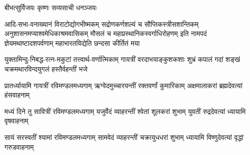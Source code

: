 \begin{center}

{बीभत्सुर्विजयः कृष्णः सव्यसाची धनञ्जयः}

\twolineshloka
{आदि-सभा-वनाख्यानं विराटोद्योगभीष्मकम्}
{सद्रोणकर्णशल्यं च सौप्तिकस्त्रीसशान्तिकम्}
\twolineshloka
{अनुशासनमप्याश्वमेधिकाश्रमवासिकम्}
{मौसलं च महाप्रस्थानिकस्वर्गाधिरोहणम्}
\twolineshloka
{इति नामपदं ज्ञेयमथाष्टादशपर्वणाम्}
{महाभारतविद्येति छन्दसा कीर्तितं मया}


{युक्तामिन्दु-निबद्ध-रत्न-मकुटां तत्त्वार्थ-वर्णात्मिकाम्}
{गायत्रीं वरदाभयाङ्कुशकशाः शुभ्रं कपालं गदां}
{शङ्खं चक्रमथारविन्दयुगलं हस्तैर्वहन्तीं भजे}

\threelineshloka
{प्रातर्ध्यायामि गायत्रीं रविमण्डलमध्यगाम्}
{ऋग्वेदमुच्चारयन्तीं रक्तवर्णां कुमारिकाम्}
{अक्षमालाकरां ब्रह्मदेवत्यां हंसवाहनाम्}

\threelineshloka
{मध्यं दिने तु सावित्रीं रविमण्डलमध्यगाम्}
{यजुर्वेदं व्याहरन्तीं श्वेतां शूलकरां शुभाम्}
{युवतीं रुद्रदेवत्यां ध्यायामि वृषवाहनाम्}

\threelineshloka
{सायं सरस्वतीं श्यामां रविमण्डलमध्यगाम्}
{सामवेदं व्याहरन्तीं चक्रायुधधरां शुभाम्}
{ध्यायामि विष्णुदेवत्यां वृद्धां गरुडवाहनाम्}








\end{center}
